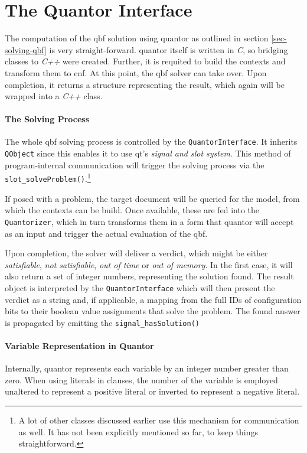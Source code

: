 \section{The Quantor Interface}
	\label{sec-quantor-interface}
	The computation of the \gls{qbf} solution using \gls{quantor} as outlined in section \ref{sec-solving-qbf} is very straight-forward.
	\Gls{quantor} itself is written in \emph{C}, so bridging classes to \emph{C++} were created.
	Further, it is requited to build the contexts and transform them to \gls{cnf}.
	At this point, the \gls{qbf} solver can take over.
	Upon completion, it returns a structure representing the result, which again will be wrapped into a \emph{C++} class.
	
	\paragraph{The Solving Process}
	The whole \gls{qbf} solving process is controlled by the \texttt{QuantorInterface}.
	It inherits \texttt{QObject} since this enables it to use \gls{qt}'s \emph{signal and slot system}. %
	This method of program-internal communication will trigger the solving process via the \texttt{slot\_solveProblem()}.\footnote{
		A lot of other classes discussed earlier use this mechanism for communication as well.
		It has not been explicitly mentioned so far, to keep things straightforward.
	}
	
	If posed with a problem, the target document will be queried for the model, from which the contexts can be build.
	Once available, these are fed into the \texttt{Quantorizer}, which in turn transforms them in a form that \gls{quantor} will accept as an input and trigger the actual evaluation of the \gls{qbf}.
	
	Upon completion, the solver will deliver a verdict, which might be either \emph{satisfiable}, \emph{not satisfiable}, \emph{out of time} or \emph{out of memory}.
	In the first case, it will also return a set of integer numbers, representing the solution found.
	The result object is interpreted by the \texttt{QuantorInterface} which will then present the verdict as a string and, if applicable, a mapping from the full IDs of configuration bits to their boolean value assignments that solve the problem.
	The found answer is propagated by emitting the \texttt{signal\_hasSolution()}

	\paragraph{Variable Representation in Quantor}
	Internally, \gls{quantor} represents each variable by an integer number greater than zero.
	When using literals in clauses, the number of the variable is employed unaltered to represent a positive literal or inverted to represent a negative literal.
	
